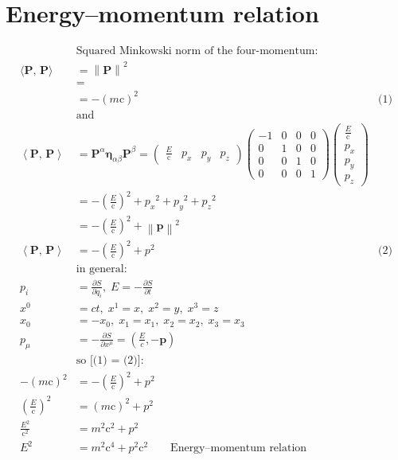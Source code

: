 \documentclass[pagesize,headsepline,10pt,parskip=half]{scrreprt}
\renewcommand{\vec}[1]{\mathbf{#1}}
\newcommand{\parray}[2]{\left(\begin{array}{#1}#2\end{array}\right)}
\newcommand{\norm}[1]{\left\|{#1}\right\|}
\renewcommand{\c}{\mathrm{c}}
\begin{document}
  \chapter{Energy{--}momentum relation}
    \begin{align*}
      &\text{Squared Minkowski norm of the four-momentum:} \\
      \langle\vec P, \, \vec P \rangle &= {\norm{\vec{P}}}^2 \\
      &=  \\
      &= -{\left(m\c\right)}^2 & \text{(1)} \\
      &\text{and} \\
      \left\langle\vec{P}, \, \vec{P}\right\rangle &= \vec P^\alpha \vec \eta_{\alpha\beta} \vec P^\beta
      = \parray{cccc}{\frac{E}{\c} & p_x & p_y & p_z} \parray{rrrr}{-1 & 0 & 0 & 0 \\ 0 & 1 & 0 & 0 \\ 0 & 0 & 1 & 0 \\ 0 & 0 & 0 & 1} \parray{c}{\frac{E}{\c} \\ p_x \\ p_y \\ p_z} \\
      &= -\left(\frac{E}{\c}\right)^2 + {p_x}^2 + {p_y}^2 + {p_z}^2 \\
      &= -\left(\frac{E}{\c}\right)^2 + \norm{\vec{p}}^2 \\
      \left\langle\vec{P}, \, \vec{P} \right\rangle{} &= -\left(\frac{E}{\c}\right)^2 + p^2 & \text{(2)} \\
      &\text{in general:} \\
      p_i &= \frac{\partial{S}}{\partial{q_i}}, \; E = -\frac{\partial{S}}{\partial{t}} \\
      x^0 &= ct, \; x^1 = x, \; x^2 = y, \; x^3 = z \\
      x_0 &= -x_0, \; x_1 = x_1, \; x_2 = x_2, \; x_3 = x_3 \\
      p_\mu &= -\frac{\partial{S}}{\partial{x^\mu}} = \left(\frac{E}{c}, -\vec{p}\right) \\
      &\text{so [(1) = (2)]:} \\
      -{\left(m\c\right)}^2 &= -\left(\frac{E}{\c}\right)^2 + p^2 \\
      \left(\frac{E}{\c}\right)^2 &= {\left(m\c\right)}^2 + p^2 \\
      \frac{E^2}{\c^2} &= m^2 \c^2 + p^2 \\
      E^2 &= m^2 \c^4 + p^2 \c^2 \qquad \text{Energy{--}momentum relation}
    \end{align*}
\end{document}
